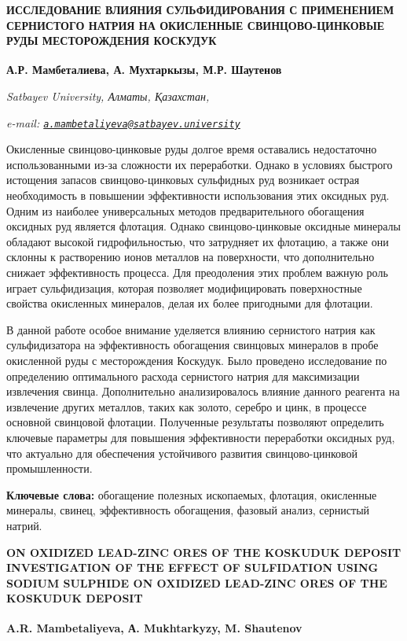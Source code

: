 \begin{articleheader}
{\bfseries ИССЛЕДОВАНИЕ ВЛИЯНИЯ СУЛЬФИДИРОВАНИЯ С ПРИМЕНЕНИЕМ СЕРНИСТОГО НАТРИЯ НА ОКИСЛЕННЫЕ СВИНЦОВО-ЦИНКОВЫЕ РУДЫ МЕСТОРОЖДЕНИЯ КОСКУДУК}

{\bfseries
А.Р. Мамбеталиева\textsuperscript{\envelope },
А. Мухтаркызы,
М.Р. Шаутенов}
\end{articleheader}

\begin{affiliation}
\emph{Satbayev University, Алматы, Қазахстан,}

\emph{e-mail: \href{mailto:a.mambetaliyeva@satbayev.university}{\nolinkurl{a.mambetaliyeva@satbayev.university}}}
\end{affiliation}

Окисленные свинцово-цинковые руды долгое время оставались недостаточно
использованными из-за сложности их переработки. Однако в условиях
быстрого истощения запасов свинцово-цинковых сульфидных руд возникает
острая необходимость в повышении эффективности использования этих
оксидных руд. Одним из наиболее универсальных методов предварительного
обогащения оксидных руд является флотация. Однако свинцово-цинковые
оксидные минералы обладают высокой гидрофильностью, что затрудняет их
флотацию, а также они склонны к растворению ионов металлов на
поверхности, что дополнительно снижает эффективность процесса. Для
преодоления этих проблем важную роль играет сульфидизация, которая
позволяет модифицировать поверхностные свойства окисленных минералов,
делая их более пригодными для флотации.

В данной работе особое внимание уделяется влиянию сернистого натрия как
сульфидизатора на эффективность обогащения свинцовых минералов в пробе
окисленной руды с месторождения Коскудук. Было проведено исследование по
определению оптимального расхода сернистого натрия для максимизации
извлечения свинца. Дополнительно анализировалось влияние данного
реагента на извлечение других металлов, таких как золото, серебро и
цинк, в процессе основной свинцовой флотации. Полученные результаты
позволяют определить ключевые параметры для повышения эффективности
переработки оксидных руд, что актуально для обеспечения устойчивого
развития свинцово-цинковой промышленности.

{\bfseries Ключевые слова:} обогащение полезных ископаемых, флотация,
окисленные минералы, свинец, эффективность обогащения, фазовый анализ,
сернистый натрий.

\begin{articleheader}
{\bfseries ON OXIDIZED LEAD-ZINC ORES OF THE KOSKUDUK DEPOSIT INVESTIGATION OF THE EFFECT OF SULFIDATION USING SODIUM SULPHIDE ON OXIDIZED LEAD-ZINC ORES OF THE KOSKUDUK DEPOSIT}

{\bfseries
A.R. Mambetaliyeva\textsuperscript{\envelope },
А. Mukhtarkyzy,
M. Shautenov}
\end{articleheader}

